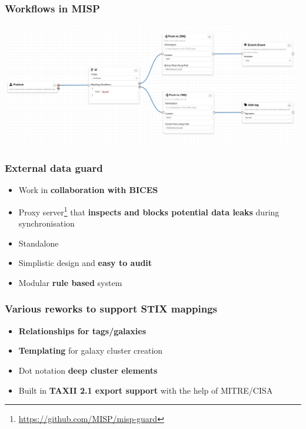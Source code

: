 \begin{frame}
\frametitle{Workflows in MISP}
\includegraphics[scale=0.2]{images/workflows2.png}
\end{frame}


\begin{frame}
  \frametitle{External data guard}
  \begin{itemize}
     \item Work in {\bf collaboration with BICES}
     \item Proxy server\footnote{\url{https://github.com/MISP/misp-guard}} that {\bf inspects and blocks potential data leaks} during synchronisation
     \item Standalone
     \item Simplistic design and {\bf easy to audit}
     \item Modular {\bf rule based} system
  \end{itemize}
\end{frame}

\begin{frame}
  \frametitle{Various reworks to support STIX mappings}
  \begin{itemize}
     \item {\bf Relationships for tags/galaxies}
     \item {\bf Templating} for galaxy cluster creation
     \item Dot notation {\bf deep cluster elements}
     \item Built in {\bf TAXII 2.1 export support} with the help of MITRE/CISA
  \end{itemize}
\end{frame}

